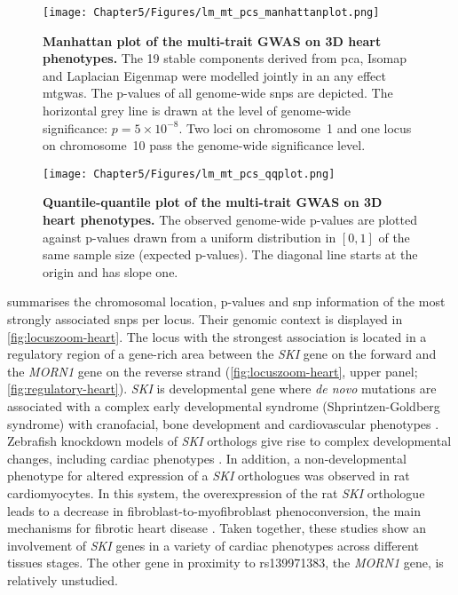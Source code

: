 \begin{figure}[hbtp]
	\centering
	\texttt{[image: Chapter5/Figures/lm\_mt\_pcs\_manhattanplot.png]}
	\caption[\textbf{Manhattan plot of the multi-trait GWAS on 3D heart phenotypes .}]{\textbf{Manhattan plot of the multi-trait GWAS on 3D heart phenotypes. }The \num{19} stable components derived from \gls{pca}, Isomap and Laplacian Eigenmap were modelled jointly in an any effect \gls{mtgwas}. The p-values of all genome-wide \glspl{snp} are depicted. The horizontal grey line is drawn at the level of genome-wide significance: \(p = 5 \times 10^{-8}\). Two loci on chromosome~1 and one locus on chromosome~10 pass the genome-wide significance level.} 
	 	\label{fig:manhattan-heart}
\end{figure}
%
\begin{figure}[hbtp]
	\centering
	\texttt{[image: Chapter5/Figures/lm\_mt\_pcs\_qqplot.png]}
	\caption[\textbf{Quantile-quantile plot of the multi-trait GWAS on 3D heart phenotypes .}]{\textbf{Quantile-quantile plot of the multi-trait GWAS on 3D heart phenotypes. } The observed genome-wide p-values are plotted against p-values drawn from a uniform distribution in \([0,1]\) of the same sample size (expected p-values). The diagonal line starts at the origin and has slope one.} 
	 	\label{fig:qq-heart}
\end{figure}
%
 summarises the chromosomal location, p-values and \gls{snp} information of the most strongly associated \glspl{snp} per locus. Their genomic context is displayed in \cref{fig:locuszoom-heart}. The locus with the strongest association is located in a regulatory region of a gene-rich area between the \textit{SKI} gene on the forward and the \textit{MORN1} gene on the reverse strand (\cref{fig:locuszoom-heart}, upper panel; \cref{fig:regulatory-heart}). \textit{SKI} is developmental gene where \textit{de novo} mutations are associated with a complex early developmental syndrome (Shprintzen-Goldberg syndrome) with cranofacial, bone development and cardiovascular phenotypes \citep{Greally1993}. Zebrafish knockdown models of \textit{SKI} orthologs give rise to complex developmental changes, including cardiac phenotypes \citep{Doyle2012}. In addition, a non-developmental phenotype for altered expression of a \textit{SKI} orthologues was observed in rat cardiomyocytes. In this system, the overexpression of the rat \textit{SKI} orthologue leads to a decrease in fibroblast-to-myofibroblast phenoconversion, the main mechanisms for fibrotic heart disease \citep{Cunnington2010,Cunnington2014,Zeglinski2016}. Taken together, these studies show an involvement of \textit{SKI} genes in a variety of cardiac phenotypes across different tissues stages. The other gene in proximity to rs139971383, the \textit{MORN1} gene, is relatively unstudied. 

